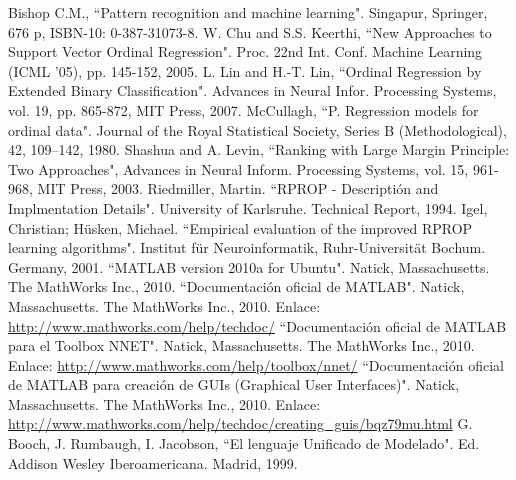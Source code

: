 \clearpage
{}

\begin{thebibliography}{99}
	 Bishop C.M., ``Pattern recognition and machine learning". Singapur, Springer, 676 p, ISBN-10: 0-387-31073-8.
	 W. Chu and S.S. Keerthi, ``New Approaches to Support Vector Ordinal Regression". Proc. 22nd Int. Conf. Machine Learning (ICML ’05), pp. 145-152, 2005.
	 L. Lin and H.-T. Lin, ``Ordinal Regression by Extended Binary Classification". Advances in Neural Infor. Processing Systems, vol. 19, pp. 865-872, MIT Press, 2007.
	 McCullagh, ``P. Regression models for ordinal data". Journal of the Royal Statistical Society, Series B (Methodological), 42, 109–142, 1980.
	 Shashua and A. Levin, ``Ranking with Large Margin Principle: Two Approaches", Advances in Neural Inform. Processing Systems, vol. 15, 961-968, MIT Press, 2003.
	 Riedmiller, Martin. ``RPROP - Descriptión and Implmentation Details". University of Karlsruhe. Technical Report, 1994.
	 Igel, Christian; Hüsken, Michael. ``Empirical evaluation of the improved RPROP learning algorithms". Institut für Neuroinformatik, Ruhr-Universität Bochum. Germany, 2001.
	 ``MATLAB version 2010a for Ubuntu". Natick, Massachusetts. The MathWorks Inc., 2010.
	 ``Documentación oficial de MATLAB". Natick, Massachusetts. The MathWorks Inc., 2010. Enlace: \url{http://www.mathworks.com/help/techdoc/}
	 ``Documentación oficial de MATLAB para el Toolbox NNET". Natick, Massachusetts. The MathWorks Inc., 2010. Enlace: \url{http://www.mathworks.com/help/toolbox/nnet/}
	 ``Documentación oficial de MATLAB para creación de GUIs (Graphical User Interfaces)". Natick, Massachusetts. The MathWorks Inc., 2010. Enlace: \url{http://www.mathworks.com/help/techdoc/creating_guis/bqz79mu.html}
	 G. Booch, J. Rumbaugh, I. Jacobson, ``El lenguaje Unificado de Modelado". Ed. Addison Wesley Iberoamericana. Madrid, 1999.
\end{thebibliography}